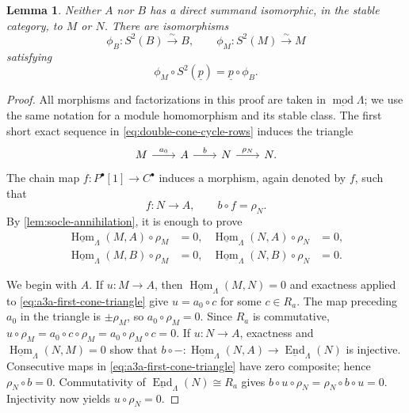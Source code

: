 \documentclass[a4paper,11pt,reqno]{amsart}
\newtheorem{lemma}[lemma]{Lemma}
\theoremstyle{definition}
\theoremstyle{plain}
\numberwithin{equation}{section}
\newcommand{\Hom}{\operatorname{Hom}}
\newcommand{\End}{\operatorname{End}}
\begin{document}
\begin{lemma}
\label{lem:a3a-two-cones}
Neither \(A\) nor \(B\) has a direct summand isomorphic, in the stable
category, to \(M\) or \(N\).  There are isomorphisms
\[
 \phi_B:S^2(B)\xrightarrow{\sim}B,
 \qquad
 \phi_M:S^2(M)\xrightarrow{\sim}M
\]
satisfying
\[
 \phi_M\circ S^2(\underline p)=\underline p\circ\phi_B.
\]
\end{lemma}

\begin{proof}
All morphisms and factorizations in this proof are taken in
\(\underline{\operatorname{mod}}\Lambda\); we use the same notation for
a module homomorphism and its stable class.  The first short exact
sequence in \eqref{eq:double-cone-cycle-rows} induces the triangle
\begin{equation}
\label{eq:a3a-first-cone-triangle}
\begin{tikzcd}[column sep=2.1em]
M\arrow[r,"a_0"]&A\arrow[r,"b"]&N\arrow[r,"\rho_N"]&N.
\end{tikzcd}
\end{equation}
The chain map \(f:P^\bullet[1]\to C^\bullet\) induces a morphism, again
denoted by \(f\), such that
\[
 f:N\longrightarrow A,
 \qquad b\circ f=\rho_N.
\]
By \cref{lem:socle-annihilation}, it is enough to prove
\begin{equation}
\label{eq:a3a-annihilation-identities}
\begin{aligned}
 \underline{\Hom}_\Lambda(M,A)\circ\rho_M&=0,&
 \underline{\Hom}_\Lambda(N,A)\circ\rho_N&=0,\\
 \underline{\Hom}_\Lambda(M,B)\circ\rho_M&=0,&
 \underline{\Hom}_\Lambda(N,B)\circ\rho_N&=0.
\end{aligned}
\end{equation}

We begin with \(A\).  If \(u:M\to A\), then
\(\underline{\Hom}_\Lambda(M,N)=0\) and exactness applied to
\eqref{eq:a3a-first-cone-triangle} give
\(u=a_0\circ c\) for some \(c\in R_a\).  The map preceding \(a_0\) in
the triangle is \(\pm\rho_M\), so \(a_0\circ\rho_M=0\).  Since \(R_a\)
is commutative, \(u\circ\rho_M
=a_0\circ c\circ\rho_M=a_0\circ\rho_M\circ c=0\).
If \(u:N\to A\), exactness and
\(\underline{\Hom}_\Lambda(N,M)=0\) show that
\(b\circ-:\underline{\Hom}_\Lambda(N,A)\to
\underline{\End}_\Lambda(N)\) is injective.  Consecutive maps in
\eqref{eq:a3a-first-cone-triangle} have zero composite; hence
\(\rho_N\circ b=0\).  Commutativity of
\(\underline{\End}_\Lambda(N)\cong R_a\) gives
\(b\circ u\circ\rho_N=\rho_N\circ b\circ u=0\).  Injectivity now yields
\(u\circ\rho_N=0\).


\end{proof}
\end{document}
